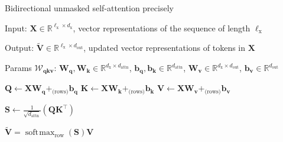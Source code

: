 \documentclass[12pt,aspectratio=169,handout]{beamer}
\DeclareMathOperator*{\softmax}{soft\!\max}
\begin{document}
\begin{frame}{Bidirectional unmasked self-attention precisely}
	
	\begin{minipage}[t][10cm][t]{15cm}
		
		Input: $\bm{X} \in \mathbb{R}^{\ell_{\text{x}} \times d_{\text{x}}}$, vector representations of the sequence of length $\ell_{\text{x}}$
		
		Output: $\bm{\tilde{V}} \in \mathbb{R}^{\ell_{\text{x}} \times d_{\text{out}}}$, updated vector representations of tokens in $\bm{X}$
		
		Params $\bm{\mathcal{W}_{qkv}}$: $\bm{W_q}, \bm{W_k} \in \mathbb{R}^{d_\text{x} \times d_\text{attn}}$, $\bm{b_q}, \bm{b_k} \in \mathbb{R}^{d_\text{attn}}$, $\bm{W_v} \in \mathbb{R}^{d_\text{x} \times d_\text{out}}$, $ \bm{b_v} \in \mathbb{R}^{d_\text{out}}$
		
		\begin{algorithmic}[1]
			\State $\bm{Q} \gets \bm{X} \bm{W_q} +_{\text{(rows)}} \bm{b_q}$
			\State $\bm{K} \gets \bm{X} \bm{W_k} +_{\text{(rows)}} \bm{b_k}$
			\State $\bm{V} \gets \bm{X} \bm{W_v} +_{\text{(rows)}} \bm{b_v}$
			
			\State $\bm{S} \gets \frac{1}{\sqrt{d_{\text{attn}}}} (\bm{Q} \bm{K}^\top)$
			
			\State \Return $\bm{\tilde V} = \softmax_{\text{row}}(\bm{S}) \bm{V}$
			
			\EndFunction
		\end{algorithmic}
		
	\end{minipage}
\end{frame}
\end{document}
